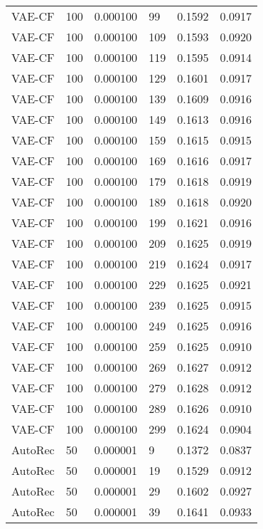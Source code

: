 \begin{tabular}{llrlrr}
  VAE-CF &  100 &  0.000100 &    99 &  0.1592 &       0.0917 \\
  VAE-CF &  100 &  0.000100 &   109 &  0.1593 &       0.0920 \\
  VAE-CF &  100 &  0.000100 &   119 &  0.1595 &       0.0914 \\
  VAE-CF &  100 &  0.000100 &   129 &  0.1601 &       0.0917 \\
  VAE-CF &  100 &  0.000100 &   139 &  0.1609 &       0.0916 \\
  VAE-CF &  100 &  0.000100 &   149 &  0.1613 &       0.0916 \\
  VAE-CF &  100 &  0.000100 &   159 &  0.1615 &       0.0915 \\
  VAE-CF &  100 &  0.000100 &   169 &  0.1616 &       0.0917 \\
  VAE-CF &  100 &  0.000100 &   179 &  0.1618 &       0.0919 \\
  VAE-CF &  100 &  0.000100 &   189 &  0.1618 &       0.0920 \\
  VAE-CF &  100 &  0.000100 &   199 &  0.1621 &       0.0916 \\
  VAE-CF &  100 &  0.000100 &   209 &  0.1625 &       0.0919 \\
  VAE-CF &  100 &  0.000100 &   219 &  0.1624 &       0.0917 \\
  VAE-CF &  100 &  0.000100 &   229 &  0.1625 &       0.0921 \\
  VAE-CF &  100 &  0.000100 &   239 &  0.1625 &       0.0915 \\
  VAE-CF &  100 &  0.000100 &   249 &  0.1625 &       0.0916 \\
  VAE-CF &  100 &  0.000100 &   259 &  0.1625 &       0.0910 \\
  VAE-CF &  100 &  0.000100 &   269 &  0.1627 &       0.0912 \\
  VAE-CF &  100 &  0.000100 &   279 &  0.1628 &       0.0912 \\
  VAE-CF &  100 &  0.000100 &   289 &  0.1626 &       0.0910 \\
  VAE-CF &  100 &  0.000100 &   299 &  0.1624 &       0.0904 \\
 AutoRec &   50 &  0.000001 &     9 &  0.1372 &       0.0837 \\
 AutoRec &   50 &  0.000001 &    19 &  0.1529 &       0.0912 \\
 AutoRec &   50 &  0.000001 &    29 &  0.1602 &       0.0927 \\
 AutoRec &   50 &  0.000001 &    39 &  0.1641 &       0.0933 \\

\end{tabular}
